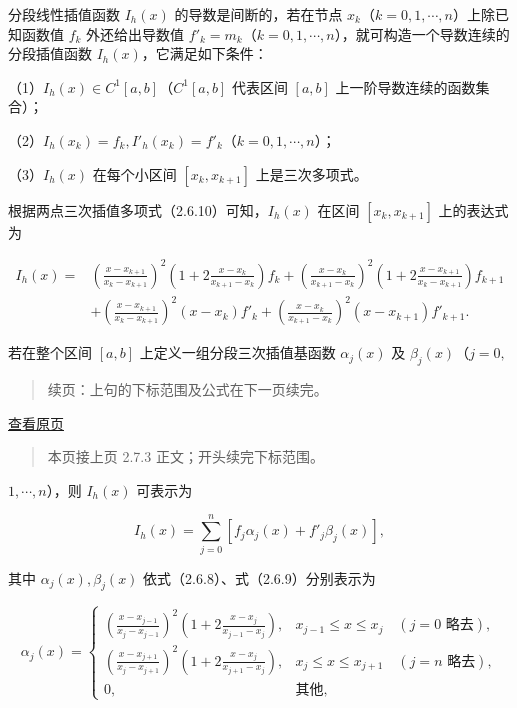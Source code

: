 \documentclass[
  10pt,
  fontset=fandol]{ctexart}
\begin{document}
分段线性插值函数 \(I_h(x)\) 的导数是间断的，若在节点 \(x_k\)（\(k=0,1,\cdots,n\)）上除已知函数值 \(f_k\) 外还给出导数值 \(f'_k=m_k\)（\(k=0,1,\cdots,n\)），就可构造一个导数连续的分段插值函数 \(I_h(x)\)，它满足如下条件：

（1）\(I_h(x)\in C^1[a,b]\)（\(C^1[a,b]\) 代表区间 \([a,b]\) 上一阶导数连续的函数集合）；

（2）\(I_h(x_k)=f_k,I'_h(x_k)=f'_k\)（\(k=0,1,\cdots,n\)）；

（3）\(I_h(x)\) 在每个小区间 \([x_k,x_{k+1}]\) 上是三次多项式。

根据两点三次插值多项式（2.6.10）可知，\(I_h(x)\) 在区间 \([x_k,x_{k+1}]\) 上的表达式为

\[\begin{aligned}
I_h(x)={}&\left(\frac{x-x_{k+1}}{x_k-x_{k+1}}\right)^2\left(1+2\frac{x-x_k}{x_{k+1}-x_k}\right)f_k+\left(\frac{x-x_k}{x_{k+1}-x_k}\right)^2\left(1+2\frac{x-x_{k+1}}{x_k-x_{k+1}}\right)f_{k+1}\\
&+\left(\frac{x-x_{k+1}}{x_k-x_{k+1}}\right)^2(x-x_k)f'_k+\left(\frac{x-x_k}{x_{k+1}-x_k}\right)^2(x-x_{k+1})f'_{k+1}.
\end{aligned}\tag{2.7.5}\]

若在整个区间 \([a,b]\) 上定义一组分段三次插值基函数 \(\alpha_j(x)\) 及 \(\beta_j(x)\)（\(j=0,\)

\begin{quote}
续页：上句的下标范围及公式在下一页续完。
\end{quote}

\href{../../source-images/pdf-048.jpeg}{查看原页}

\begin{quote}
本页接上页 2.7.3 正文；开头续完下标范围。
\end{quote}

\(1,\cdots,n\)），则 \(I_h(x)\) 可表示为

\[I_h(x)=\sum_{j=0}^n[f_j\alpha_j(x)+f'_j\beta_j(x)],\tag{2.7.6}\]

其中 \(\alpha_j(x),\beta_j(x)\) 依式（2.6.8）、式（2.6.9）分别表示为

\[\alpha_j(x)=\begin{cases}
\displaystyle\left(\frac{x-x_{j-1}}{x_j-x_{j-1}}\right)^2\left(1+2\frac{x-x_j}{x_{j-1}-x_j}\right),&x_{j-1}\leqslant x\leqslant x_j\quad(j=0\text{ 略去}),\\[6pt]
\displaystyle\left(\frac{x-x_{j+1}}{x_j-x_{j+1}}\right)^2\left(1+2\frac{x-x_j}{x_{j+1}-x_j}\right),&x_j\leqslant x\leqslant x_{j+1}\quad(j=n\text{ 略去}),\\[6pt]
0,&\text{其他},
\end{cases}\tag{2.7.7}\]
\end{document}
